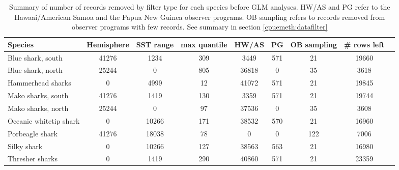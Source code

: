 \documentclass[12pt]{SCreport}
\begin{document}
\clearpage
\begin{landscape}
\thispagestyle{empty}
 \begin{table}[!h]
\caption{Summary of number of records removed by filter type for each species before GLM analyses. HW/AS and PG refer to the Hawaai/American Samoa and the Papua New Guinea observer programs. OB sampling refers to records removed from observer programs with few records. See summary in section \ref{cpuemeth:datafilter} \label{tbl:glmdata}}
\begin{center}
\begin{tabular}{l|c|c|c|c|c|c|c|c}
Species & Hemisphere & SST range & max quantile & HW/AS & PG & OB sampling & \# rows left\\
\hline
\hline
Blue shark, south&41276&1234&309&3449&571&21&19660\\ 
Blue shark, north&25244&0&805&36818&0&35&3618\\ 
Hammerhead sharks&0&4999&12&41072&571&21&19845\\ 
Mako sharks, south&41276&1419&130&3359&571&21&19744\\ 
Mako sharks, north&25244&0&97&37536&0&35&3608\\ 
Oceanic whitetip shark&0&10266&171&38532&570&21&16960\\ 
Porbeagle shark&41276&18038&78&0&0&122&7006\\ 
Silky shark&0&10266&127&38563&563&21&16980\\ 
Thresher sharks&0&1419&290&40860&571&21&23359\\


\end{tabular}
\end{center}
\end{table}
\end{landscape}
\end{document}
